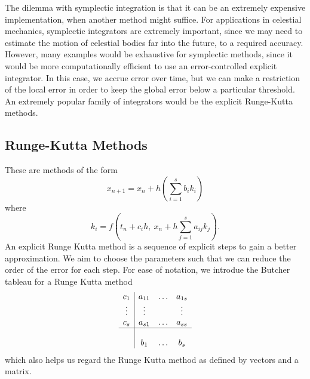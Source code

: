 \documentclass{report}
\begin{document}
The dilemma with symplectic integration is that it can be an extremely expensive implementation, when another method might suffice.
For applications in celestial mechanics, symplectic integrators are extremely important, since we may need to estimate the motion of celestial bodies far into the future, to a required accuracy.
However, many examples would be exhaustive for symplectic methods, since it would be more computationally efficient to use an error-controlled explicit integrator.
In this case, we accrue error over time, but we can make a restriction of the local error in order to keep the global error below a particular threshold.
An extremely popular family of integrators would be the explicit Runge-Kutta methods.

\subsection{Runge-Kutta Methods}

These are methods of the form
\begin{equation*}
	x_{n+1} = x_n + h(\sum_{i = 1}^{s} b_i k_i )
\end{equation*}
where
\begin{equation*}
	k_i = f(t_n + c_i h,~ x_n + h\sum_{j = 1}^{s} a_{ij}k_j).	
\end{equation*}
An explicit Runge Kutta method is a sequence of explicit steps to gain a better approximation.
We aim to choose the parameters such that we can reduce the order of the error for each step.
For ease of notation, we introdue the Butcher tableau for a Runge Kutta method
\begin{equation*}
	\begin{array}{c|ccc}
		c_1  &a_{11} &\hdots &a_{1s} \\
		\vdots &\vdots & &\vdots \\
		c_s &a_{s1} &\hdots &a_{ss} \\
		\hline \\
		 &b_1 &\hdots &b_s
	\end{array}
\end{equation*}
which also helps us regard the Runge Kutta method as defined by vectors and a matrix.















\appendix
\end{document}
